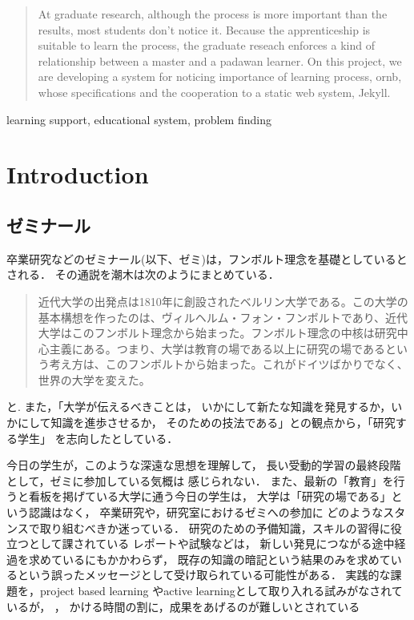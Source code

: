 \documentclass{hissymp}
\author{bob}
\date{}
\begin{document}
\begin{abstract}
\label{sec:org94eb056}
At graduate research,
although the process is more important than the results,
most students don't notice it.
Because the apprenticeship is suitable to learn the process,
the graduate reseach enforces a kind of
relationship between
a master and a padawan learner.
On this project,
we are developing a system for
noticing importance of learning process,
ornb, whose specifications and
the cooperation to a static web system, Jekyll.

\end{abstract}

\begin{keyword}
learning support, educational system, problem finding
\end{keyword}

\maketitle
\section{Introduction}

\label{sec:orge985c0c}
\subsection{ゼミナール}
\label{sec:org09ec250}
卒業研究などのゼミナール(以下、ゼミ)は，フンボルト理念を基礎としているとされる．
その通説を潮木は次のようにまとめている．
\begin{quote}
近代大学の出発点は1810年に創設されたベルリン大学である。この大学の基本構想を作ったのは、ヴィルヘルム・フォン・フンボルトであり、近代大学はこのフンボルト理念から始まった。フンボルト理念の中核は研究中心主義にある。つまり、大学は教育の場である以上に研究の場であるという考え方は、このフンボルトから始まった。これがドイツばかりでなく、世界の大学を変えた。
\cite{Ushiogi_column}
\end{quote}
と. また，「大学が伝えるべきことは，
いかにして新たな知識を発見するか，いかにして知識を進歩させるか，
そのための技法である」との観点から，「研究する学生」
を志向したとしている\cite{Ushiogi}．

今日の学生が，このような深遠な思想を理解して，
長い受動的学習の最終段階として，ゼミに参加している気概は
感じられない．
また、最新の「教育」を行うと看板を掲げている大学に通う今日の学生は，
大学は「研究の場である」という認識はなく，
卒業研究や，研究室におけるゼミへの参加に
どのようなスタンスで取り組むべきか迷っている．
研究のための予備知識，スキルの習得に役立つとして課されている
レポートや試験などは，
新しい発見につながる途中経過を求めているにもかかわらず，
既存の知識の暗記という結果のみを求めているという誤ったメッセージとして受け取られている可能性がある．
実践的な課題を，project based learning \cite{Bell}
やactive learningとして取り入れる試みがなされているが，
\cite{Settles}，\cite{溝上}
かける時間の割に，成果をあげるのが難しいとされている
\end{document}
